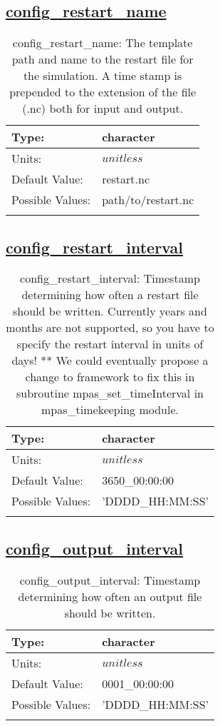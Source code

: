 \subsection[config\_restart\_name]{\hyperref[sec:nm_tab_io]{config\_restart\_name}}
\label{subsec:nm_sec_config_restart_name}
\begin{center}
\begin{longtable}{| p{2.0in} | p{4.0in} |}
    \hline
    Type: & character \\
    \hline
    Units: & $unitless$ \\
    \hline
    Default Value: & restart.nc \\
    \hline
    Possible Values: & path/to/restart.nc \\
    \hline
    \caption{config\_restart\_name: The template path and name to the restart file for the simulation. A time stamp is prepended to the extension of the file (.nc) both for input and output.}
\end{longtable}
\end{center}
\subsection[config\_restart\_interval]{\hyperref[sec:nm_tab_io]{config\_restart\_interval}}
\label{subsec:nm_sec_config_restart_interval}
\begin{center}
\begin{longtable}{| p{2.0in} | p{4.0in} |}
    \hline
    Type: & character \\
    \hline
    Units: & $unitless$ \\
    \hline
    Default Value: & 3650\_00:00:00 \\
    \hline
    Possible Values: & 'DDDD\_HH:MM:SS' \\
    \hline
    \caption{config\_restart\_interval: Timestamp determining how often a restart file should be written.  Currently years and months are not supported, so you have to specify the restart interval in units of days! **  We could eventually propose a change to framework to fix this in subroutine mpas\_set\_timeInterval in mpas\_timekeeping module.}
\end{longtable}
\end{center}
\subsection[config\_output\_interval]{\hyperref[sec:nm_tab_io]{config\_output\_interval}}
\label{subsec:nm_sec_config_output_interval}
\begin{center}
\begin{longtable}{| p{2.0in} | p{4.0in} |}
    \hline
    Type: & character \\
    \hline
    Units: & $unitless$ \\
    \hline
    Default Value: & 0001\_00:00:00 \\
    \hline
    Possible Values: & 'DDDD\_HH:MM:SS' \\
    \hline
    \caption{config\_output\_interval: Timestamp determining how often an output file should be written.}
\end{longtable}
\end{center}
